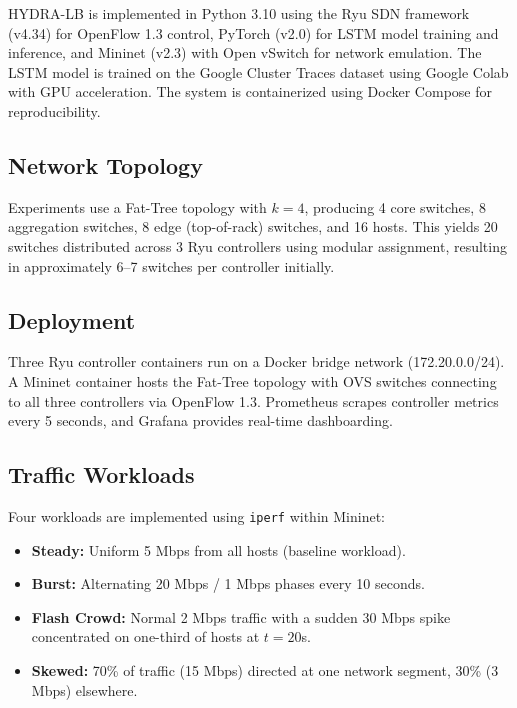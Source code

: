 \documentclass[12pt,a4paper]{report}
\begin{document}
HYDRA-LB is implemented in Python 3.10 using the Ryu SDN framework (v4.34) for OpenFlow 1.3 control, PyTorch (v2.0) for LSTM model training and inference, and Mininet (v2.3) with Open vSwitch for network emulation. The LSTM model is trained on the Google Cluster Traces dataset using Google Colab with GPU acceleration. The system is containerized using Docker Compose for reproducibility.

\subsection{Network Topology}

Experiments use a Fat-Tree topology with $k=4$, producing 4 core switches, 8 aggregation switches, 8 edge (top-of-rack) switches, and 16 hosts. This yields 20 switches distributed across 3 Ryu controllers using modular assignment, resulting in approximately 6--7 switches per controller initially.

\subsection{Deployment}

Three Ryu controller containers run on a Docker bridge network (172.20.0.0/24). A Mininet container hosts the Fat-Tree topology with OVS switches connecting to all three controllers via OpenFlow 1.3. Prometheus scrapes controller metrics every 5 seconds, and Grafana provides real-time dashboarding.

\subsection{Traffic Workloads}

Four workloads are implemented using \texttt{iperf} within Mininet:

\begin{itemize}
    \item \textbf{Steady:} Uniform 5 Mbps from all hosts (baseline workload).
    \item \textbf{Burst:} Alternating 20 Mbps / 1 Mbps phases every 10 seconds.
    \item \textbf{Flash Crowd:} Normal 2 Mbps traffic with a sudden 30 Mbps spike concentrated on one-third of hosts at $t=20$s.
    \item \textbf{Skewed:} 70\% of traffic (15 Mbps) directed at one network segment, 30\% (3 Mbps) elsewhere.
\end{itemize}
\end{document}

